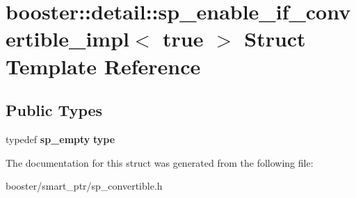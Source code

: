 \section{booster\+:\+:detail\+:\+:sp\+\_\+enable\+\_\+if\+\_\+convertible\+\_\+impl$<$ true $>$ Struct Template Reference}
\label{structbooster_1_1detail_1_1sp__enable__if__convertible__impl_3_01true_01_4}
\subsection*{Public Types}
\begin{DoxyCompactItemize}
\item 
typedef {\bf sp\+\_\+empty} {\bfseries type}\label{structbooster_1_1detail_1_1sp__enable__if__convertible__impl_3_01true_01_4_a77e77502ef1d78384dd43603333cb058}

\end{DoxyCompactItemize}


The documentation for this struct was generated from the following file\+:\begin{DoxyCompactItemize}
\item 
booster/smart\+\_\+ptr/sp\+\_\+convertible.\+h\end{DoxyCompactItemize}
